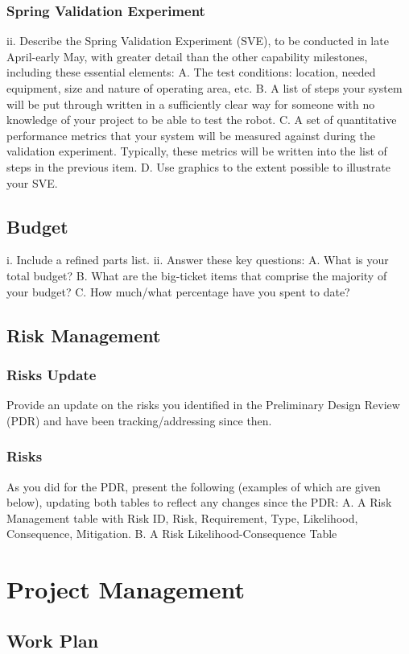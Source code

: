 \documentclass[12pt]{extarticle}
\begin{document}
\subsubsection{Spring Validation Experiment}
ii. Describe the Spring Validation Experiment (SVE), to be conducted in late April-early
May, with greater detail than the other capability milestones, including these
essential elements:
A. The test conditions: location, needed equipment, size and nature of
operating area, etc.
B. A list of steps your system will be put through written in a sufficiently clear
way for someone with no knowledge of your project to be able to test the
robot.
C. A set of quantitative performance metrics that your system will be measured
against during the validation experiment. Typically, these metrics will be
written into the list of steps in the previous item.
D. Use graphics to the extent possible to illustrate your SVE.

\subsection{Budget}
i. Include a refined parts list.
ii. Answer these key questions:
A. What is your total budget?
B. What are the big-ticket items that comprise the majority of your budget?
C. How much/what percentage have you spent to date?
\subsection{Risk Management}
\subsubsection{Risks Update}
Provide an update on the risks you identified in the Preliminary Design Review (PDR)
and have been tracking/addressing since then.
\subsubsection{Risks}
As you did for the PDR, present the following (examples of which are given below),
updating both tables to reflect any changes since the PDR:
A. A Risk Management table with Risk ID, Risk, Requirement, Type, Likelihood,
Consequence, Mitigation.
B. A Risk Likelihood-Consequence Table

\section{Project Management}
\subsection{Work Plan}
\end{document}
